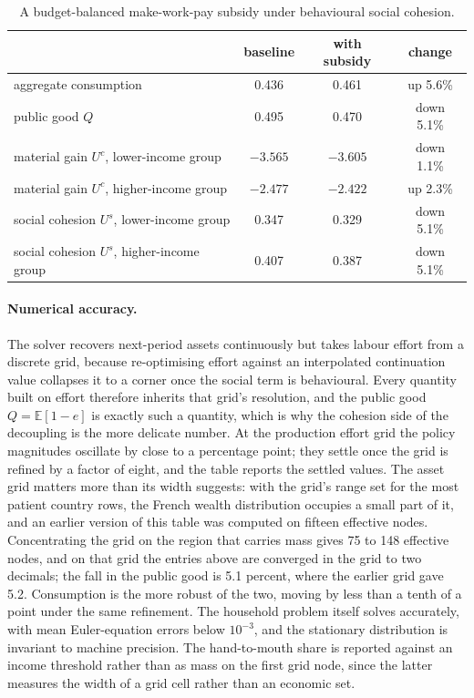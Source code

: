 \documentclass[11pt]{article}
\begin{document}
\begin{table}[t]
\centering
\caption{A budget-balanced make-work-pay subsidy under behavioural social cohesion.}
\label{tab:policy}
\begin{tabular}{lccc}
\toprule
 & baseline & with subsidy & change \\
\midrule
aggregate consumption & 0.436 & 0.461 & up 5.6\% \\
public good $Q$ & 0.495 & 0.470 & down 5.1\% \\
material gain $U^c$, lower-income group & $-3.565$ & $-3.605$ & down 1.1\% \\
material gain $U^c$, higher-income group & $-2.477$ & $-2.422$ & up 2.3\% \\
social cohesion $U^s$, lower-income group & 0.347 & 0.329 & down 5.1\% \\
social cohesion $U^s$, higher-income group & 0.407 & 0.387 & down 5.1\% \\
\bottomrule
\end{tabular}
\end{table}

\paragraph{Numerical accuracy.} The solver recovers next-period assets continuously but takes labour effort from a discrete grid, because re-optimising effort against an interpolated continuation value collapses it to a corner once the social term is behavioural. Every quantity built on effort therefore inherits that grid's resolution, and the public good $Q = \mathbb{E}[1-e]$ is exactly such a quantity, which is why the cohesion side of the decoupling is the more delicate number. At the production effort grid the policy magnitudes oscillate by close to a percentage point; they settle once the grid is refined by a factor of eight, and the table reports the settled values. The asset grid matters more than its width suggests: with the grid's range set for the most patient country rows, the French wealth distribution occupies a small part of it, and an earlier version of this table was computed on fifteen effective nodes. Concentrating the grid on the region that carries mass gives 75 to 148 effective nodes, and on that grid the entries above are converged in the grid to two decimals; the fall in the public good is 5.1 percent, where the earlier grid gave 5.2. Consumption is the more robust of the two, moving by less than a tenth of a point under the same refinement. The household problem itself solves accurately, with mean Euler-equation errors below $10^{-3}$, and the stationary distribution is invariant to machine precision. The hand-to-mouth share is reported against an income threshold rather than as mass on the first grid node, since the latter measures the width of a grid cell rather than an economic set.
\end{document}
